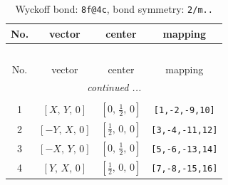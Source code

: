\documentclass[fleqn,8pt]{jsarticle}
\begin{document}
\renewcommand{\arraystretch}{1.2}
\begin{longtable}{cccc}
\caption{Wyckoff bond: {\tt 8f@4c}, bond symmetry: {\tt 2/m..}}
 \\
 \hline \hline
No. & vector & center & mapping \\ \hline \endfirsthead

\multicolumn{3}{l}{\tablename\ \thetable{}} \\
 \hline \hline
No. & vector & center & mapping \\ \hline \endhead

 \hline \hline
\multicolumn{3}{r}{\footnotesize\it continued ...} \\ \endfoot

 \hline \hline
\multicolumn{3}{r}{} \\ \endlastfoot

1 & $\left[ X,\, Y,\, 0 \right]$ & $\left[ 0,\, \frac{1}{2},\, 0 \right]$ & {\tt [1,-2,-9,10]} \\ \hline
2 & $\left[ - Y,\, X,\, 0 \right]$ & $\left[ \frac{1}{2},\, 0,\, 0 \right]$ & {\tt [3,-4,-11,12]} \\ \hline
3 & $\left[ - X,\, Y,\, 0 \right]$ & $\left[ 0,\, \frac{1}{2},\, 0 \right]$ & {\tt [5,-6,-13,14]} \\ \hline
4 & $\left[ Y,\, X,\, 0 \right]$ & $\left[ \frac{1}{2},\, 0,\, 0 \right]$ & {\tt [7,-8,-15,16]} \\
\end{longtable}
\renewcommand{\arraystretch}{1.2}
\end{document}
